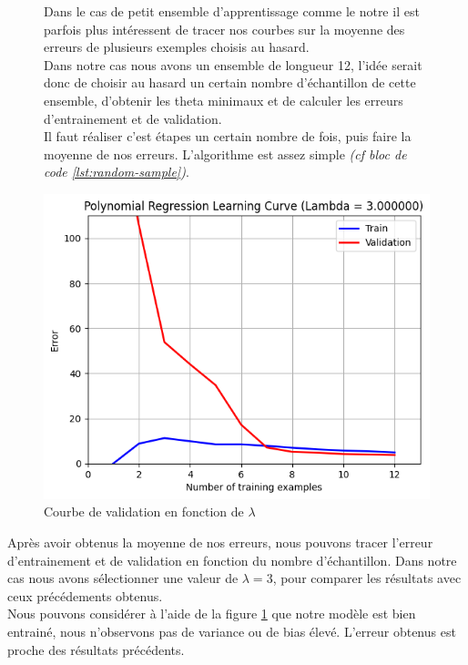 \begin{figure}[!h]
    \begin{minipage}{.44\linewidth}
        Dans le cas de petit ensemble d'apprentissage comme le notre il est parfois plus intéressent de tracer nos courbes sur la moyenne des erreurs de plusieurs exemples choisis au hasard. \\

        Dans notre cas nous avons un ensemble de longueur 12, l'idée serait donc de choisir au hasard un certain nombre d'échantillon de cette ensemble, d'obtenir les theta minimaux et de calculer les erreurs d'entrainement et de validation.\\
        Il faut réaliser c'est étapes un certain nombre de fois, puis faire la moyenne de nos erreurs. L'algorithme est assez simple \textit{(cf bloc de code \ref{lst:random-sample})}. \\


    \end{minipage}\hfill
    \begin{minipage}{.56\linewidth}
        \begin{center}
            \includegraphics[width=.9\textwidth]{./img/5.5.png}
            \caption{\label{fig:validation-curve-poly}Courbe de validation en fonction de $\lambda$}  
        \end{center}
    \end{minipage}
\end{figure}

Après avoir obtenus la moyenne de nos erreurs, nous pouvons tracer l'erreur d'entrainement et de validation en fonction du nombre d'échantillon. Dans notre cas nous avons sélectionner une valeur de $\lambda = 3$, pour comparer les résultats avec ceux précédements obtenus. \\
Nous pouvons considérer à l'aide de la figure \ref{fig:validation-curve-poly} que notre modèle est bien entrainé, nous n'observons pas de variance ou de bias élevé. L'erreur obtenus est proche des résultats précédents.




